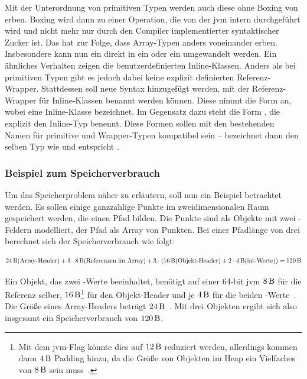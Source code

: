 Mit der Unterordnung von primitiven Typen werden auch diese ohne Boxing von  erben.
Boxing wird dann zu einer Operation, die von der \ac{jvm} intern durchgeführt wird und nicht mehr nur durch den Compiler implementierter syntaktischer Zucker ist.
Das hat zur Folge, dass Array-Typen anders voneinander erben.
Insbesondere kann nun ein  direkt in ein  oder ein  umgewandelt werden.
Ein ähnliches Verhalten zeigen die benutzerdefinierten Inline-Klassen.
Anders als bei primitiven Typen gibt es jedoch dabei keine explizit definierten Referenz-Wrapper.
Stattdessen soll neue Syntax hinzugefügt werden, mit der Referenz-Wrapper für Inline-Klassen benannt werden können.
Diese nimmt die Form  an, wobei  eine Inline-Klasse bezeichnet.
Im Gegensatz dazu steht die Form , die explizit den Inline-Typ benennt.
Diese Formen sollen mit den bestehenden Namen für primitive und Wrapper-Typen kompatibel sein --  bezeichnet dann den selben Typ wie  und  entspricht .

\subsubsection{Beispiel zum Speicherverbrauch}\label{subsubsec:memory-example}

Um das Speicherproblem näher zu erläutern, soll nun ein Beispiel betrachtet werden.
Es sollen einige ganzzahlige Punkte im zweidimensionalen Raum gespeichert werden, die einen Pfad bilden.
Die Punkte sind als Objekte mit zwei -Feldern modelliert, der Pfad als Array von Punkten.
Bei einer Pfadlänge von drei berechnet sich der Speicherverbrauch wie folgt:

\[ \SI{24}{\byte} \text{(Array-Header)} + 3 \cdot \SI{8}{\byte} \text{(Referenzen im Array)} + 3 \cdot (\SI{16}{\byte} \text{(Objekt-Header)} + 2 \cdot \SI{4}{\byte} \text{(int-Werte)}) = \SI{120}{\byte} \]

Ein Objekt, das zwei -Werte beeinhaltet, benötigt auf einer 64-bit \ac{jvm} $\SI{8}{\byte}$ für die Referenz selber, $\SI{16}{\byte}$\footnote{Mit dem \ac{jvm}-Flag  könnte dies auf $\SI{12}{\byte}$ reduziert werden, allerdings kommen dann $\SI{4}{\byte}$ Padding hinzu, da die Größe von Objekten im Heap ein Vielfaches von $\SI{8}{\byte}$ sein muss~\cite{compressed-oops}.} für den Objekt-Header und je $\SI{4}{\byte}$ für die beiden -Werte~\cite{compressed-oops}.
Die Größe eines Array-Headers beträgt $\SI{24}{\byte}$~\cite{compressed-oops}.
Mit drei Objekten ergibt sich also insgesamt ein Speicherverbrauch von $\SI{120}{\byte}$.

